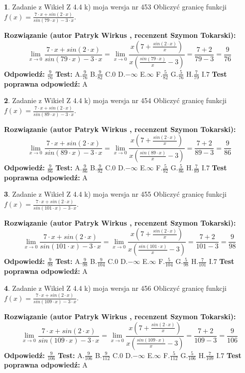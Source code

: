 \documentclass[12pt, a4paper]{article}
\theoremstyle{definition} %
\newtheorem{zad}{}
\newcommand{\zadStart}[1]{\begin{zad}#1\newline}
\newcommand{\zadStop}{\end{zad}}
\newcommand{\rozwStart}[2]{\noindent \textbf{Rozwiązanie (autor #1 , recenzent #2): }\newline}
\newcommand{\rozwStop}{\newline}
\newcommand{\odpStart}{\noindent \textbf{Odpowiedź:}\newline}
\newcommand{\odpStop}{\newline}
\newcommand{\testStart}{\noindent \textbf{Test:}\newline}
\newcommand{\testStop}{\newline}
\newcommand{\kluczStart}{\noindent \textbf{Test poprawna odpowiedź:}\newline}
\newcommand{\kluczStop}{\newline}
\begin{document}
\zadStart{Zadanie z Wikieł Z 4.4 k) moja wersja nr 453}
Obliczyć granicę funkcji $f(x)=\frac{7\cdot x +sin(2\cdot x)}{sin(79\cdot x) -3\cdot x}$.
\zadStop
\rozwStart{Patryk Wirkus}{Szymon Tokarski}
$$\lim\limits_{x\to 0}\frac{7\cdot x +sin(2\cdot x)}{sin(79\cdot x) -3\cdot x}
=\lim\limits_{x\to 0}\frac{x(7+\frac{sin(2\cdot x)}{x})}{x(\frac{sin(79\cdot x)}{x}-3)}
=\frac{7+2}{79-3} = \frac{9}{76}$$
\rozwStop
\odpStart
$\frac{9}{76}$
\odpStop
\testStart
A.$\frac{9}{76}$
B.$\frac{9}{82}$
C.$0$
D.$-\infty$
E.$\infty$
F.$\frac{5}{82}$
G.$\frac{5}{76}$
H.$\frac{7}{79}$
I.$7$
\testStop
\kluczStart
A
\kluczStop



\zadStart{Zadanie z Wikieł Z 4.4 k) moja wersja nr 454}
Obliczyć granicę funkcji $f(x)=\frac{7\cdot x +sin(2\cdot x)}{sin(89\cdot x) -3\cdot x}$.
\zadStop
\rozwStart{Patryk Wirkus}{Szymon Tokarski}
$$\lim\limits_{x\to 0}\frac{7\cdot x +sin(2\cdot x)}{sin(89\cdot x) -3\cdot x}
=\lim\limits_{x\to 0}\frac{x(7+\frac{sin(2\cdot x)}{x})}{x(\frac{sin(89\cdot x)}{x}-3)}
=\frac{7+2}{89-3} = \frac{9}{86}$$
\rozwStop
\odpStart
$\frac{9}{86}$
\odpStop
\testStart
A.$\frac{9}{86}$
B.$\frac{9}{92}$
C.$0$
D.$-\infty$
E.$\infty$
F.$\frac{5}{92}$
G.$\frac{5}{86}$
H.$\frac{7}{89}$
I.$7$
\testStop
\kluczStart
A
\kluczStop



\zadStart{Zadanie z Wikieł Z 4.4 k) moja wersja nr 455}
Obliczyć granicę funkcji $f(x)=\frac{7\cdot x +sin(2\cdot x)}{sin(101\cdot x) -3\cdot x}$.
\zadStop
\rozwStart{Patryk Wirkus}{Szymon Tokarski}
$$\lim\limits_{x\to 0}\frac{7\cdot x +sin(2\cdot x)}{sin(101\cdot x) -3\cdot x}
=\lim\limits_{x\to 0}\frac{x(7+\frac{sin(2\cdot x)}{x})}{x(\frac{sin(101\cdot x)}{x}-3)}
=\frac{7+2}{101-3} = \frac{9}{98}$$
\rozwStop
\odpStart
$\frac{9}{98}$
\odpStop
\testStart
A.$\frac{9}{98}$
B.$\frac{9}{104}$
C.$0$
D.$-\infty$
E.$\infty$
F.$\frac{5}{104}$
G.$\frac{5}{98}$
H.$\frac{7}{101}$
I.$7$
\testStop
\kluczStart
A
\kluczStop



\zadStart{Zadanie z Wikieł Z 4.4 k) moja wersja nr 456}
Obliczyć granicę funkcji $f(x)=\frac{7\cdot x +sin(2\cdot x)}{sin(109\cdot x) -3\cdot x}$.
\zadStop
\rozwStart{Patryk Wirkus}{Szymon Tokarski}
$$\lim\limits_{x\to 0}\frac{7\cdot x +sin(2\cdot x)}{sin(109\cdot x) -3\cdot x}
=\lim\limits_{x\to 0}\frac{x(7+\frac{sin(2\cdot x)}{x})}{x(\frac{sin(109\cdot x)}{x}-3)}
=\frac{7+2}{109-3} = \frac{9}{106}$$
\rozwStop
\odpStart
$\frac{9}{106}$
\odpStop
\testStart
A.$\frac{9}{106}$
B.$\frac{9}{112}$
C.$0$
D.$-\infty$
E.$\infty$
F.$\frac{5}{112}$
G.$\frac{5}{106}$
H.$\frac{7}{109}$
I.$7$
\testStop
\kluczStart
A
\kluczStop
\end{document}
